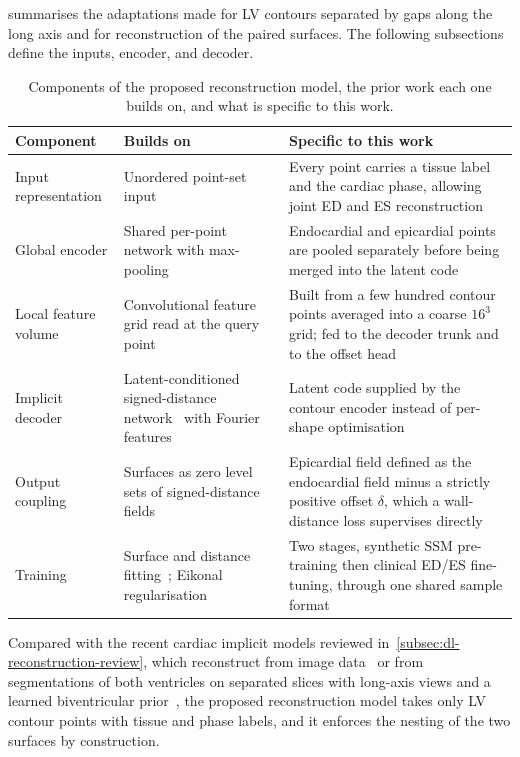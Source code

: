  summarises the adaptations made for
LV contours separated by gaps along the long axis and for reconstruction of
the paired surfaces. The following
subsections define the inputs, encoder, and decoder.

\begin{table}[H]
	\centering
	\caption[Origin of the reconstruction components]{Components of the proposed
	reconstruction model, the prior work each one builds on, and what is
	specific to this work.}
	\label{tab:model-components-origin}
	\small
	\renewcommand{\arraystretch}{1.12}
	\begin{tabular}{p{} p{} p{}}
		\toprule
		Component & Builds on & Specific to this work \\
		\midrule
		Input representation & Unordered point-set input~\parencite{qi2017pointnet} & Every point carries a tissue label and the cardiac phase, allowing joint ED and ES reconstruction \\
		Global encoder & Shared per-point network with max-pooling~\parencite{qi2017pointnet} & Endocardial and epicardial points are pooled separately before being merged into the latent code \\
		Local feature volume & Convolutional feature grid read at the query point~\parencite{peng2020convonet} & Built from a few hundred contour points averaged into a coarse $16^3$ grid; fed to the decoder trunk and to the offset head \\
		Implicit decoder & Latent-conditioned signed-distance network~\parencite{deepsdf2019} with Fourier features~\parencite{tancik2020fourierfeatures} & Latent code supplied by the contour encoder instead of per-shape optimisation \\
		Output coupling & Surfaces as zero level sets of signed-distance fields~\parencite{deepsdf2019} & Epicardial field defined as the endocardial field minus a strictly positive offset $\delta$, which a wall-distance loss supervises directly \\
		Training & Surface and distance fitting~\parencite{deepsdf2019}; Eikonal regularisation~\parencite{gropp2020igr} & Two stages, synthetic SSM pre-training then clinical ED/ES fine-tuning, through one shared sample format \\
		\bottomrule
	\end{tabular}
\end{table}

Compared with the recent cardiac implicit models reviewed in~\cref{subsec:dl-reconstruction-review}, which reconstruct from image data~\parencite{bras2026anisotropy} or from segmentations of both ventricles on separated slices
with long-axis views and a learned biventricular prior~\parencite{muffoletto2025nihc}, the proposed reconstruction model takes only LV contour points
with tissue and phase labels, and it enforces the nesting of the two surfaces
by construction.

